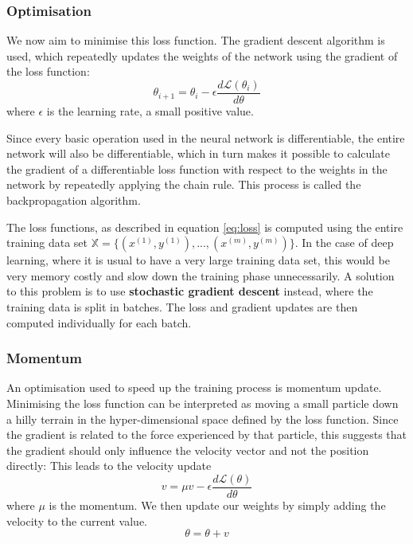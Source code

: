 \documentclass[12pt,a4paper,twoside,openright]{report}
\begin{document}
\subsubsection{Optimisation}
We now aim to minimise this loss function. The gradient descent algorithm is used, which repeatedly updates the weights of the network using the gradient of the loss function:
\begin{equation}
	\theta_{i+1} = \theta_{i} - \epsilon \frac{d\mathcal{L}(\theta_{i})}{d\theta}
\end{equation}
where $\epsilon$ is the learning rate, a small positive value.

Since every basic operation used in the neural network is differentiable, the entire network will also be differentiable, which in turn makes it possible to calculate the gradient of a differentiable loss function with respect to the weights in the network by repeatedly applying the chain rule. This process is called the backpropagation algorithm.

The loss functions, as described in equation \ref{eq:loss} is computed using the entire training data set $\mathbb{X} = \{(x^{(1)},y^{(1)}), ...,(x^{(m)},y^{(m)})\}$. In the case of deep learning, where it is usual to have a very large training data set, this would be very memory costly and slow down the training phase unnecessarily. A solution to this problem is to use \textbf{stochastic gradient descent} instead, where the training data is split in batches. The loss and gradient updates are then computed individually for each batch.

\subsubsection{Momentum}
An optimisation used to speed up the training process is momentum update. Minimising the loss function can be interpreted as moving a small particle down a hilly terrain in the hyper-dimensional space defined by the loss function. Since the gradient is related to the force experienced by that particle, this suggests that the gradient should only influence the velocity vector and not the position directly: This leads to the velocity update
\begin{equation}
	v = \mu  v - \epsilon \frac{d\mathcal{L}(\theta)}{d\theta}
\end{equation}
where $\mu$ is the momentum. We then update our weights by simply adding the velocity to the current value.
\begin{equation}
	\theta = \theta + v
\end{equation}
\end{document}
